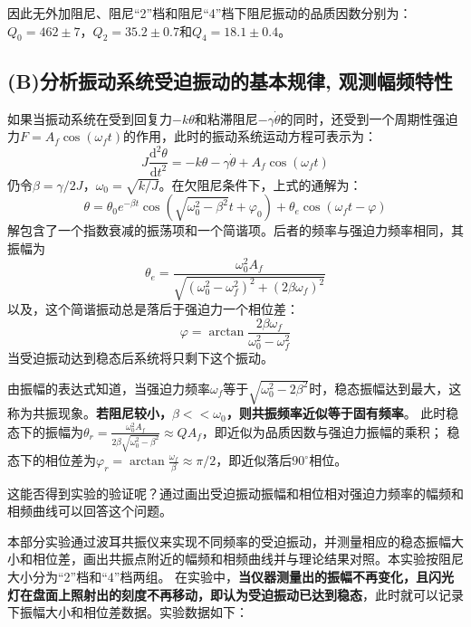 \documentclass[11pt,a4paper,UTF8]{ctexart}
\begin{document}
因此无外加阻尼、阻尼“2”档和阻尼“4”档下阻尼振动的品质因数分别为：
$\boxed{Q_0=462\pm7}$，$\boxed{Q_2=35.2\pm0.7}$和$\boxed{Q_4=18.1\pm0.4}$。

\subsection{(B)分析振动系统受迫振动的基本规律, 观测幅频特性}

如果当振动系统在受到回复力$-k\theta$和粘滞阻尼$-\gamma\dot{\theta}$的同时，还受到一个周期性强迫力$F=A_f\cos(\omega_f t)$的作用，此时的振动系统运动方程可表示为：
	\[J\frac{\mathrm{d}^2 \theta}{\mathrm{d}t^2}=-k\theta-\gamma\dot{\theta}+A_f\cos(\omega_f t)\tag{12}\]
仍令$\beta=\gamma/2J$，$\omega_0=\sqrt{k/J}$。在欠阻尼条件下，上式的通解为：
	\[\theta=\theta_{0} e^{-\beta t} \cos \left(\sqrt{\omega_{0}^{2}-\beta^{2}} t+\varphi_{0}\right)+\theta_{e} \cos (\omega_f t-\varphi)\tag{13}\]
解包含了一个指数衰减的振荡项和一个简谐项。后者的频率与强迫力频率相同，其振幅为
	\[\theta_e=\frac{\omega_{0}^{2} A_{f}}{\sqrt{\left(\omega_{0}^{2}-\omega_f^{2}\right)^{2}+(2\beta \omega_f)^{2}}}\tag{14}\]
以及，这个简谐振动总是落后于强迫力一个相位差：
	\[\varphi=\arctan{\frac{2\beta\omega_f}{\omega_0^2-\omega_f^2}}\tag{15}\]
当受迫振动达到稳态后系统将只剩下这个振动。

由振幅的表达式知道，当强迫力频率$\omega_f$等于$\sqrt{\omega_0^2-2\beta^2}$时，稳态振幅达到最大，这称为共振现象。\textbf{若阻尼较小，$\beta<<\omega_0$，则共振频率近似等于固有频率}。
此时稳态下的振幅为$\theta_r=\frac{\omega_0^2A_f}{2\beta\sqrt{\omega^2_0-\beta^2}}\approx QA_f$，即近似为品质因数与强迫力振幅的乘积；
稳态下的相位差为$\varphi_r=\arctan{\frac{\omega_f}{\beta}}\approx\pi/2$，即近似落后$90^{\circ}$相位。

这能否得到实验的验证呢？通过画出受迫振动振幅和相位相对强迫力频率的幅频和相频曲线可以回答这个问题。

本部分实验通过波耳共振仪来实现不同频率的受迫振动，并测量相应的稳态振幅大小和相位差，画出共振点附近的幅频和相频曲线并与理论结果对照。本实验按阻尼大小分为“2”档和“4”档两组。
在实验中，\textbf{当仪器测量出的振幅不再变化，且闪光灯在盘面上照射出的刻度不再移动，即认为受迫振动已达到稳态}，此时就可以记录下振幅大小和相位差数据。实验数据如下：
\end{document}
